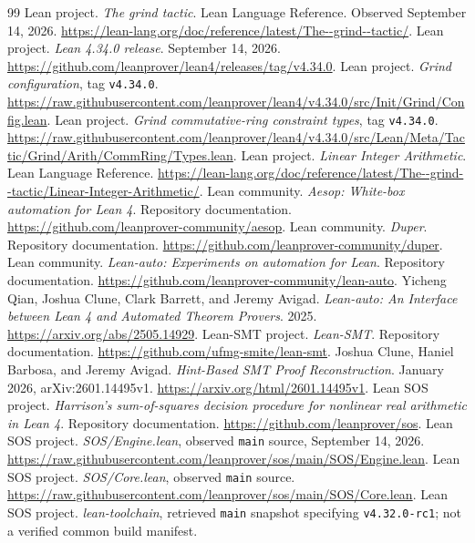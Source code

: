 \documentclass[11pt,a4paper]{article}
\newcommand{\code}[1]{\texttt{#1}}
\begin{document}
\newpage
\renewcommand{\refname}{Sources}
\begin{thebibliography}{99}
\small
{} Lean project. \emph{The grind tactic}. Lean Language Reference.
Observed September 14, 2026. \url{https://lean-lang.org/doc/reference/latest/The--grind--tactic/}.
 Lean project. \emph{Lean 4.34.0 release}. September 14, 2026.
\url{https://github.com/leanprover/lean4/releases/tag/v4.34.0}.
 Lean project. \emph{Grind configuration}, tag \code{v4.34.0}.
\url{https://raw.githubusercontent.com/leanprover/lean4/v4.34.0/src/Init/Grind/Config.lean}.
 Lean project. \emph{Grind commutative-ring constraint types}, tag \code{v4.34.0}.
\url{https://raw.githubusercontent.com/leanprover/lean4/v4.34.0/src/Lean/Meta/Tactic/Grind/Arith/CommRing/Types.lean}.
 Lean project. \emph{Linear Integer Arithmetic}. Lean Language Reference.
\url{https://lean-lang.org/doc/reference/latest/The--grind--tactic/Linear-Integer-Arithmetic/}.
 Lean community. \emph{Aesop: White-box automation for Lean 4}. Repository documentation.
\url{https://github.com/leanprover-community/aesop}.
 Lean community. \emph{Duper}. Repository documentation.
\url{https://github.com/leanprover-community/duper}.
 Lean community. \emph{Lean-auto: Experiments on automation for Lean}. Repository documentation.
\url{https://github.com/leanprover-community/lean-auto}.
 Yicheng Qian, Joshua Clune, Clark Barrett, and Jeremy Avigad.
\emph{Lean-auto: An Interface between Lean 4 and Automated Theorem Provers}. 2025.
\url{https://arxiv.org/abs/2505.14929}.
 Lean-SMT project. \emph{Lean-SMT}. Repository documentation.
\url{https://github.com/ufmg-smite/lean-smt}.
 Joshua Clune, Haniel Barbosa, and Jeremy Avigad.
\emph{Hint-Based SMT Proof Reconstruction}. January 2026, arXiv:2601.14495v1.
\url{https://arxiv.org/html/2601.14495v1}.
 Lean SOS project. \emph{Harrison's sum-of-squares decision procedure for nonlinear real arithmetic in Lean 4}. Repository documentation.
\url{https://github.com/leanprover/sos}.
 Lean SOS project. \emph{SOS/Engine.lean}, observed \code{main} source, September 14, 2026.
\url{https://raw.githubusercontent.com/leanprover/sos/main/SOS/Engine.lean}.
 Lean SOS project. \emph{SOS/Core.lean}, observed \code{main} source.
\url{https://raw.githubusercontent.com/leanprover/sos/main/SOS/Core.lean}.
 Lean SOS project. \emph{lean-toolchain}, retrieved \code{main} snapshot specifying \code{v4.32.0-rc1}; not a verified common build manifest.

\end{thebibliography}
\end{document}
